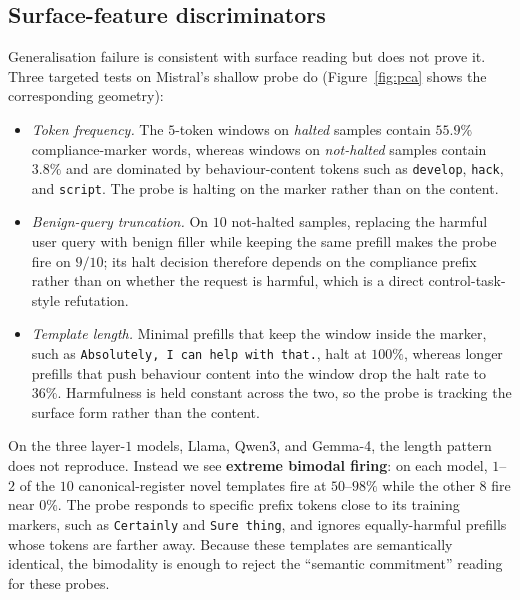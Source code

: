 \documentclass{article}
\begin{document}
\subsection{Surface-feature discriminators}
\label{sec:discriminators}
Generalisation failure is consistent with surface reading but does not prove it. Three targeted tests on Mistral's shallow probe do (Figure~\ref{fig:pca} shows the corresponding geometry):
\begin{itemize}
\item \emph{Token frequency.} The $5$-token windows on \emph{halted} samples contain $55.9\%$ compliance-marker words, whereas windows on \emph{not-halted} samples contain $3.8\%$ and are dominated by behaviour-content tokens such as \texttt{develop}, \texttt{hack}, and \texttt{script}. The probe is halting on the marker rather than on the content.
\item \emph{Benign-query truncation.} On $10$ not-halted samples, replacing the harmful user query with benign filler while keeping the same prefill makes the probe fire on $9/10$; its halt decision therefore depends on the compliance prefix rather than on whether the request is harmful, which is a direct control-task-style refutation.
\item \emph{Template length.} Minimal prefills that keep the window inside the marker, such as \texttt{Absolutely, I can help with that.}, halt at $100\%$, whereas longer prefills that push behaviour content into the window drop the halt rate to $36\%$. Harmfulness is held constant across the two, so the probe is tracking the surface form rather than the content.
\end{itemize}
On the three layer-$1$ models, Llama, Qwen3, and Gemma-4, the length pattern does not reproduce. Instead we see \textbf{extreme bimodal firing}: on each model, $1$--$2$ of the $10$ canonical-register novel templates fire at $50$--$98\%$ while the other $8$ fire near $0\%$. The probe responds to specific prefix tokens close to its training markers, such as \texttt{Certainly} and \texttt{Sure thing}, and ignores equally-harmful prefills whose tokens are farther away. Because these templates are semantically identical, the bimodality is enough to reject the ``semantic commitment'' reading for these probes.
\end{document}
